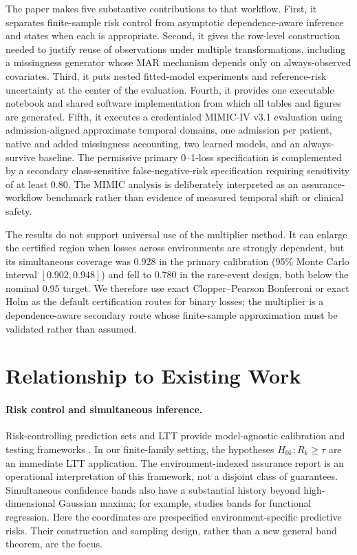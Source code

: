 \documentclass[twoside,11pt]{article}
\begin{document}
The paper makes five substantive contributions to that workflow. First, it separates
finite-sample risk control from asymptotic dependence-aware inference and states when each
is appropriate. Second, it gives the row-level construction needed to justify reuse of
observations under multiple transformations, including a missingness generator whose MAR
mechanism depends only on always-observed covariates. Third, it puts nested fitted-model
experiments and reference-risk uncertainty at the center of the evaluation. Fourth, it provides
one executable notebook and shared software implementation from which all tables and
figures are generated. Fifth, it executes a credentialed MIMIC-IV v3.1 evaluation using
admission-aligned approximate temporal domains, one admission per patient, native and added
missingness accounting, two learned models, and an always-survive baseline. The permissive
primary 0--1-loss specification is complemented by a secondary class-sensitive
false-negative-risk specification requiring sensitivity of at least 0.80. The MIMIC analysis
is deliberately interpreted as an assurance-workflow benchmark rather than evidence of measured
temporal shift or clinical safety.

The results do not support universal use of the multiplier method. It can enlarge the certified
region when losses across environments are strongly dependent, but its simultaneous coverage
was 0.928 in the primary calibration (95\% Monte Carlo interval $[0.902,0.948]$) and fell to
0.780 in the rare-event design, both below the nominal 0.95 target. We therefore use exact
Clopper--Pearson Bonferroni or exact Holm as the default certification routes for binary losses;
the multiplier is a dependence-aware secondary route whose finite-sample approximation must be
validated rather than assumed.

\section{Relationship to Existing Work}
\label{sec:related}
\paragraph{Risk control and simultaneous inference.}
Risk-controlling prediction sets and LTT provide model-agnostic calibration and testing
frameworks \citep{bates2021rcps,angelopoulos2025ltt}. In our finite-family setting, the hypotheses
$H_{0k}:R_k\geq\tau$ are an immediate LTT application. The environment-indexed assurance
report is an operational interpretation of this framework, not a disjoint class of guarantees.
Simultaneous confidence bands also have a substantial history beyond high-dimensional
Gaussian maxima; for example, \citet{degras2011} studies bands for functional regression.
Here the coordinates are prespecified environment-specific predictive risks. Their construction
and sampling design, rather than a new general band theorem, are the focus.
\end{document}
